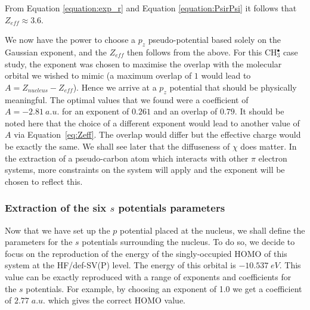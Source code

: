 \documentclass[aip]{revtex4-1}
\begin{document}
From Equation \ref{equation:exp_r} and Equation \ref{equation:PsirPsi} it follows that \(Z_{eff} \approx 3.6\). 

We now have the power to choose a \(p_{z}\) pseudo-potential based solely on the Gaussian
exponent, and the \(Z_{eff}\) then follows from the above.
For this CH\(^{\bullet}_{3}\) case study, 
the exponent was chosen to maximise the overlap with the molecular
orbital we wished to mimic (a maximum overlap of $1$ would lead to
$A=Z_{nucleus}-Z_{eff}$).
Hence we arrive at a \(p_{z}\) potential that should be physically meaningful. 
The optimal values that we found
were a coefficient of $A=-2.81 \ a.u.$ for 
an exponent of $0.261$ and an overlap of $0.79$. 
It should be noted here that the choice of a different exponent would lead to another value
of $A$ via Equation~\ref{eq:Zeff}.
The overlap would differ but the effective charge would be exactly the same.
We shall see later that the diffuseness of $\chi$ does matter. In the extraction of a pseudo-carbon atom which interacts with other
$\pi$ electron systems, more constraints on the system will apply and the exponent
will be chosen to reflect this.

\subsubsection{Extraction of the six $s$ potentials parameters}
Now that we have set up the $p$ potential placed at the nucleus, we shall define
the parameters for the $s$ potentials surrounding the nucleus.
To do so, we decide to focus on the reproduction of the energy of the singly-occupied HOMO of this system
at the HF/def-SV(P) level. The energy of this orbital is $-10.537\;eV$.
This value can be exactly reproduced with a range of exponents and coefficients for the $s$ potentials. For example, by choosing an exponent of 1.0 we get a coefficient of $2.77\;a.u.$ which gives the correct HOMO value.
\end{document}
